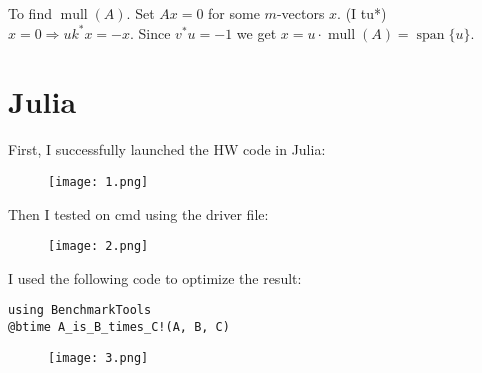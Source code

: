 \documentclass{article}
\begin{document}
To find $\operatorname{mull}(A)$. Set $A x=0$ for some $m$-vectors $x$. (I tu*) $x=0 \Rightarrow u k^* x=-x$. Since $v^* u=-1$ we get $x=u \cdot \operatorname{mull}(A)=\operatorname{span}\{u\}$.
\section{Julia}
First, I successfully launched the HW code in Julia:
\begin{figure}[H]
  \centering
  \texttt{[image: 1.png]}
  \label{fig:image_label}
\end{figure}
Then I tested on cmd using the driver file:
\begin{figure}[H]
  \centering
  \texttt{[image: 2.png]}
  \label{fig:image_label}
\end{figure}
I used the following code to optimize the result:
\begin{verbatim}
using BenchmarkTools
@btime A_is_B_times_C!(A, B, C)
\end{verbatim}
\begin{figure}[H]
  \centering
  \texttt{[image: 3.png]}
  \label{fig:image_label}
\end{figure}
\end{document}
